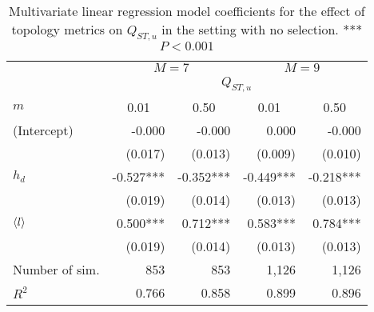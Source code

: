 \begin{table}
  \caption{ Multivariate linear regression model coefficients for the effect of topology metrics on $Q_{ST,u}$ in the setting with no selection. *** $P < 0.001$}
  \centering
  \begin{tabular}{lrrrr}
    \toprule
    &                                                    \multicolumn{2}{c}{$M=7$} & \multicolumn{2}{c}{$M=9$}                                         \\
    \cmidrule(lr){2-3} \cmidrule(lr){4-5} 
    &                                                    \multicolumn{4}{c}{$Q_{ST,u}$}                                                               \\
     \cmidrule(lr){2-5} 
$m$             & \multicolumn{1}{c}{0.01} & \multicolumn{1}{c}{0.50}  & \multicolumn{1}{c}{0.01} & \multicolumn{1}{c}{0.50} \\
    \hline 
    (Intercept) &                   -0.000 &                   -0.000 &                    0.000 &                   -0.000 \\       
                &                  (0.017) &                  (0.013) &                  (0.009) &                  (0.010) \\       
    $h_d$       &                -0.527*** &                -0.352*** &                -0.449*** &                -0.218*** \\       
                &                  (0.019) &                  (0.014) &                  (0.013) &                  (0.013) \\       
    $\langle l \rangle$        &                 0.500*** &                 0.712*** &                 0.583*** &                 0.784*** \\       
                &                  (0.019) &                  (0.014) &                  (0.013) &                  (0.013) \\       
    \midrule 
Number of sim.  &                      853 &                      853 &                    1,126 &                    1,126 \\       
    $R^2$       &                    0.766 &                    0.858 &                    0.899 &                    0.896 \\       
    \bottomrule
    \end{tabular}
    \label{table:coefficients_set1}
\end{table}
\FloatBarrier

